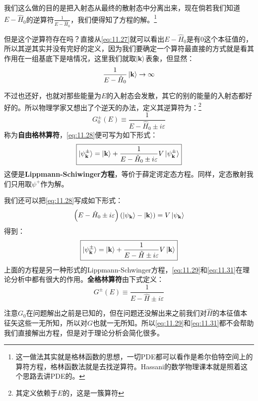 \documentclass[a4paper,zihao=-4,linespread=1]{ctexrep}
\begin{document}
	我们这么做的目的是把入射态从最终的散射态中分离出来，现在倘若我们知道$E-\hat{H}_0$的逆算符$\frac{1}{E-\hat{H}_0}$，我们便得知了方程的解。\footnote{这一做法其实就是格林函数的思想，一切PDE都可以看作是希尔伯特空间上的算符方程，格林函数法就是去找逆算符。Hassani的数学物理课本就是照着这个思路去讲PDE的。}
	
	但是这个逆算符存在吗？直接从\ref{eq:11.27}就可以看出$E-\hat{H}_0$是有$0$这个本征值的，所以其逆其实并没有完好的定义，因为我们要确定一个算符最直接的方式就是看其作用在一组基底下是啥情况，这里我们就取$\ket{\mathbf{k}}$表象，但显然：
	\[\frac{1}{E-\hat{H}_0}\ket{\mathbf{k}}\to\infty\]
	
	不过也还好，也就对那些能量为$E$的入射态会发散，其它的别的能量的入射态都好好的。所以物理学家又想出了个逆天的办法，定义其逆算符为：\footnote{其定义依赖于$E$的，这是一簇算符}
	\begin{equation}
		\boxed{
		G_0^{\pm}(E)\equiv\frac{1}{E-\hat{H}_0\pm i\varepsilon}}
	\end{equation}
	称为\textbf{自由格林算符}，\ref{eq:11.28}便可写为如下形式：
	\begin{equation}
		\label{eq:11.29}
		\boxed{
		\ket{\psi^\pm_{\mathbf{k}}}=\ket{\mathbf{k}}+\frac{1}{E-\hat{H}_0\pm i\varepsilon}V\ket{\psi^\pm_{\mathbf{k}}}
	}
	\end{equation}
	这便是\textbf{Lippmann-Schiwinger方程}，等价于薛定谔定态方程。同样，定态散射我们只用取$\psi^+$作为解。
	
	我们还可以把\ref{eq:11.28}写成如下形式：
	\begin{equation}
	\left(E-\hat{H}_0\pm i\varepsilon\right)\left(\ket{\psi_\mathbf{k}}-\ket{\mathbf{k}}\right)=V\ket{\psi_\mathbf{k}}
	\end{equation}
	得到：
	\begin{equation}
		\label{eq:11.31}
		\boxed{
			\ket{\psi^\pm_{\mathbf{k}}}=\ket{\mathbf{k}}+\frac{1}{E-\hat{H}\pm i\varepsilon}V\ket{\mathbf{k}}
		}
	\end{equation}
	上面的方程是另一种形式的Lippmann-Schwinger方程，\ref{eq:11.29}和\ref{eq:11.31}在理论分析中都有很大的作用。\textbf{全格林算符}由下式定义：
	\begin{equation}
		\boxed{
			G^{\pm}(E)\equiv\frac{1}{E-\hat{H}\pm i\varepsilon}}
	\end{equation}
	
	注意$G_0$在问题解出之前是已知的，但在问题还没解出来之前我们对$\hat{H}$的本征值本征矢这些一无所知，所以对$G$也就一无所知。所以\ref{eq:11.29}和\ref{eq:11.31}都不会帮助我们直接解出方程，但是对于理论分析会简化很多。
	
\end{document}
